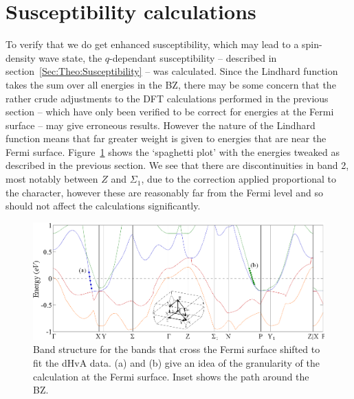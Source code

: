 
\section{Susceptibility calculations}
    \label{Sec:ResD:SubsceptibilityCalculation}

To verify that we do get enhanced susceptibility, which may lead to a spin-density wave state, the $q$-dependant susceptibility -- described in section~\ref{Sec:Theo:Susceptibility} -- was calculated. Since the Lindhard function takes the sum over all energies in the \ac{BZ}, there may be some concern that the rather crude adjustments to the \ac{DFT} calculations performed in the previous section -- which have only been verified to be correct for energies at the Fermi surface -- may give erroneous results. However the nature of the Lindhard function means that far greater weight is given to energies that are near the Fermi surface. Figure~\ref{Fig:ResD:ShiftedBandStructure} shows the `spaghetti plot' with the energies tweaked as described in the previous section. We see that there are discontinuities in band 2, most notably between $Z$ and $\Sigma_1$, due to the correction applied proportional to the \DzTwo{} character, however these are reasonably far from the Fermi level and so should not affect the calculations significantly.
\begin{figure}[htbp]
    \begin{center}
        \includegraphics[scale=0.9]{Chapter-dHvABaFe2P2/Figures/AngleDepMeasurements/ShiftedBandStructure/ShiftedBandStructure}
        \caption{Band structure for the bands that cross the Fermi surface shifted to fit the dHvA data. (a) and (b) give an idea of the granularity of the \WIEN{} calculation at the Fermi surface. Inset shows the path around the \ac{BZ}.}
        \label{Fig:ResD:ShiftedBandStructure}
    \end{center}
\end{figure}

